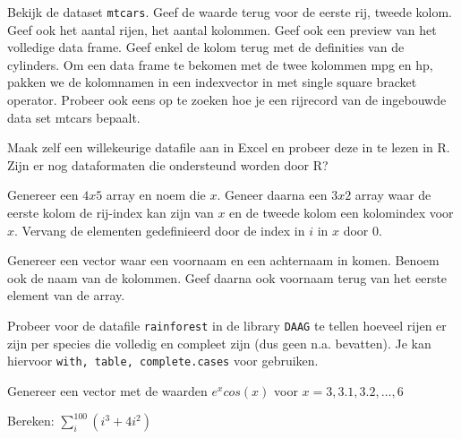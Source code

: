 \begin{exercise}
  Bekijk de dataset \texttt{mtcars}. Geef de waarde terug voor de eerste rij, tweede kolom. Geef ook het aantal rijen, het aantal kolommen. Geef ook een preview van het volledige data frame. Geef enkel de kolom terug met de definities van de cylinders. Om een data frame te bekomen met de twee kolommen mpg en hp, pakken we de kolomnamen in een indexvector in met single square bracket operator. Probeer ook eens op te zoeken hoe je een rijrecord van de ingebouwde data set mtcars bepaalt.
\end{exercise}

\begin{exercise}
  Maak zelf een willekeurige datafile aan in Excel en probeer deze in te lezen in R. Zijn er nog dataformaten die ondersteund worden door R?
\end{exercise}

\begin{exercise}
  Genereer een $4x5$ array en noem die $x$. Geneer daarna een $3x2$ array waar de eerste kolom de rij-index kan zijn van $x$ en de tweede kolom een kolomindex voor $x$. Vervang de elementen gedefinieerd door de index in $i$ in $x$ door 0. 
\end{exercise}

\begin{exercise}
  Genereer een vector waar een voornaam en een achternaam in komen. Benoem ook de naam van de kolommen. Geef daarna ook voornaam terug van het eerste element van de array. 
\end{exercise}

\begin{exercise}
  Probeer voor de datafile \texttt{rainforest} in de library \texttt{DAAG} te tellen hoeveel rijen er zijn per species die volledig en compleet zijn (dus geen n.a. bevatten). Je kan hiervoor \texttt{with, table, complete.cases} voor gebruiken. 
\end{exercise}

\begin{exercise}
	Genereer een vector met de waarden $e^x cos(x)$ voor $x= 3, 3.1, 3.2, \dots ,6$
\end{exercise}

\begin{exercise}
	Bereken: $\sum_{i}^{100}(i^3 + 4i^2)$
\end{exercise}

